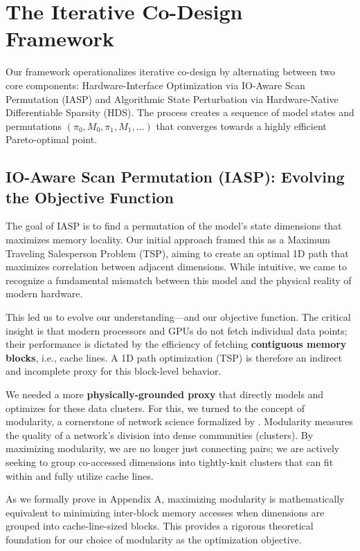 \documentclass{article}
\begin{document}
\section{The Iterative Co-Design Framework}
\label{sec:methodology}

Our framework operationalizes iterative co-design by alternating between two core components: Hardware-Interface Optimization via IO-Aware Scan Permutation (IASP) and Algorithmic State Perturbation via Hardware-Native Differentiable Sparsity (HDS). The process creates a sequence of model states and permutations $(\pi_0, M_0, \pi_1, M_1, \dots)$ that converges towards a highly efficient Pareto-optimal point.

\subsection{IO-Aware Scan Permutation (IASP): Evolving the Objective Function}
\label{sec:iasp}

The goal of IASP is to find a permutation of the model's state dimensions that maximizes memory locality. Our initial approach framed this as a Maximum Traveling Salesperson Problem (TSP), aiming to create an optimal 1D path that maximizes correlation between adjacent dimensions. While intuitive, we came to recognize a fundamental mismatch between this model and the physical reality of modern hardware.

This led us to evolve our understanding—and our objective function. The critical insight is that modern processors and GPUs do not fetch individual data points; their performance is dictated by the efficiency of fetching \textbf{contiguous memory blocks}, i.e., {cache lines}. A 1D path optimization (TSP) is therefore an indirect and incomplete proxy for this block-level behavior.

We needed a more \textbf{physically-grounded proxy} that directly models and optimizes for these data clusters. For this, we turned to the concept of {modularity}, a cornerstone of network science formalized by \citet{newman2006modularity}. Modularity measures the quality of a network's division into dense communities (clusters). By maximizing modularity, we are no longer just connecting pairs; we are actively seeking to group co-accessed dimensions into tightly-knit clusters that can fit within and fully utilize cache lines.

As we formally prove in Appendix A, maximizing modularity is mathematically equivalent to minimizing inter-block memory accesses when dimensions are grouped into cache-line-sized blocks. This provides a rigorous theoretical foundation for our choice of modularity as the optimization objective.
\end{document}
